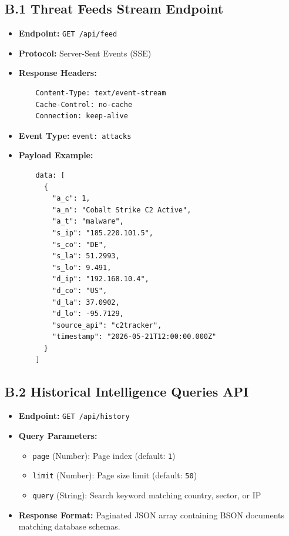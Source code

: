 \subsection*{B.1 Threat Feeds Stream Endpoint}
\begin{itemize}
    \item \textbf{Endpoint:} \texttt{GET /api/feed}
    \item \textbf{Protocol:} Server-Sent Events (SSE)
    \item \textbf{Response Headers:}
    \begin{verbatim}
    Content-Type: text/event-stream
    Cache-Control: no-cache
    Connection: keep-alive
    \end{verbatim}
    \item \textbf{Event Type:} \texttt{event: attacks}
    \item \textbf{Payload Example:}
    \begin{verbatim}
    data: [
      {
        "a_c": 1,
        "a_n": "Cobalt Strike C2 Active",
        "a_t": "malware",
        "s_ip": "185.220.101.5",
        "s_co": "DE",
        "s_la": 51.2993,
        "s_lo": 9.491,
        "d_ip": "192.168.10.4",
        "d_co": "US",
        "d_la": 37.0902,
        "d_lo": -95.7129,
        "source_api": "c2tracker",
        "timestamp": "2026-05-21T12:00:00.000Z"
      }
    ]
    \end{verbatim}
\end{itemize}

\subsection*{B.2 Historical Intelligence Queries API}
\begin{itemize}
    \item \textbf{Endpoint:} \texttt{GET /api/history}
    \item \textbf{Query Parameters:}
    \begin{itemize}
        \item \texttt{page} (Number): Page index (default: \texttt{1})
        \item \texttt{limit} (Number): Page size limit (default: \texttt{50})
        \item \texttt{query} (String): Search keyword matching country, sector, or IP
    \end{itemize}
    \item \textbf{Response Format:} Paginated JSON array containing BSON documents matching database schemas.
\end{itemize}

